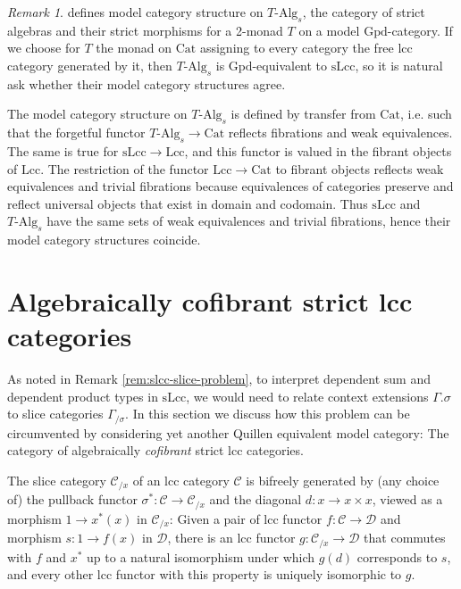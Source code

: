\documentclass[a4paper]{article}
\theoremstyle{remark}
\newtheorem{remark}[theorem]{Remark}
\theoremstyle{definition}
\begin{document}
\begin{remark}
  \citet{homotopy-theoretic-aspects} defines model category structure on $T\text{-Alg}_s$, the category of strict algebras and their strict morphisms for a 2-monad $T$ on a model $\mathrm{Gpd}$-category.
  If we choose for $T$ the monad on $\mathrm{Cat}$ assigning to every category the free lcc category generated by it, then $T\text{-Alg}_s$ is $\mathrm{Gpd}$-equivalent to $\mathrm{sLcc}$, so it is natural ask whether their model category structures agree.

  The model category structure on $T\text{-Alg}_s$ is defined by transfer from $\mathrm{Cat}$, i.e. such that the forgetful functor $T\text{-Alg}_s \rightarrow \mathrm{Cat}$ reflects fibrations and weak equivalences.
  The same is true for $\mathrm{sLcc} \rightarrow \mathrm{Lcc}$, and this functor is valued in the fibrant objects of $\mathrm{Lcc}$.
  The restriction of the functor $\mathrm{Lcc} \rightarrow \mathrm{Cat}$ to fibrant objects reflects weak equivalences and trivial fibrations because equivalences of categories preserve and reflect universal objects that exist in domain and codomain.
  Thus $\mathrm{sLcc}$ and $T\text{-Alg}_s$ have the same sets of weak equivalences and trivial fibrations, hence their model category structures coincide.
\end{remark}

\section{Algebraically cofibrant strict lcc categories}
\label{sec:algebraically-cofibrant}

As noted in Remark \ref{rem:slcc-slice-problem}, to interpret dependent sum and dependent product types in $\mathrm{sLcc}$, we would need to relate context extensions $\Gamma.\sigma$ to slice categories $\Gamma_{/ \sigma}$.
In this section we discuss how this problem can be circumvented by considering yet another Quillen equivalent model category: The category of algebraically \emph{cofibrant} strict lcc categories.

The slice category $\mathcal{C}_{/ x}$ of an lcc category $\mathcal{C}$ is bifreely generated by (any choice of) the pullback functor $\sigma^* : \mathcal{C} \rightarrow \mathcal{C}_{/ x}$ and the diagonal $d : x \rightarrow x \times x$, viewed as a morphism $1 \rightarrow x^*(x)$ in $\mathcal{C}_{/ x}$:
Given a pair of lcc functor $f : \mathcal{C} \rightarrow \mathcal{D}$ and morphism $s : 1 \rightarrow f(x)$ in $\mathcal{D}$, there is an lcc functor $g : \mathcal{C}_{/ x} \rightarrow \mathcal{D}$ that commutes with $f$ and $x^*$ up to a natural isomorphism under which $g(d)$ corresponds to $s$, and every other lcc functor with this property is uniquely isomorphic to $g$.
\end{document}
